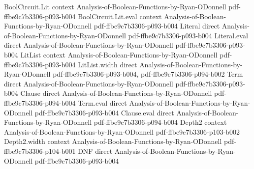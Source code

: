 \begin{theorem}
\leanok
{}
\proofstep
  {BoolCircuit.Lit}
  {context}
  {Analysis-of-Boolean-Functions-by-Ryan-ODonnell}
  {pdf-ffbe9c7b3306-p093-b004}
\proofstep
  {BoolCircuit.Lit.eval}
  {context}
  {Analysis-of-Boolean-Functions-by-Ryan-ODonnell}
  {pdf-ffbe9c7b3306-p093-b004}
\proofstep
  {Literal}
  {direct}
  {Analysis-of-Boolean-Functions-by-Ryan-ODonnell}
  {pdf-ffbe9c7b3306-p093-b004}
\proofstep
  {Literal.eval}
  {direct}
  {Analysis-of-Boolean-Functions-by-Ryan-ODonnell}
  {pdf-ffbe9c7b3306-p093-b004}
\proofstep
  {LitList}
  {context}
  {Analysis-of-Boolean-Functions-by-Ryan-ODonnell}
  {pdf-ffbe9c7b3306-p093-b004}
\proofstep
  {LitList.width}
  {direct}
  {Analysis-of-Boolean-Functions-by-Ryan-ODonnell}
  {pdf-ffbe9c7b3306-p093-b004,
    pdf-ffbe9c7b3306-p094-b002}
\proofstep
  {Term}
  {direct}
  {Analysis-of-Boolean-Functions-by-Ryan-ODonnell}
  {pdf-ffbe9c7b3306-p093-b004}
\proofstep
  {Clause}
  {direct}
  {Analysis-of-Boolean-Functions-by-Ryan-ODonnell}
  {pdf-ffbe9c7b3306-p094-b004}
\proofstep
  {Term.eval}
  {direct}
  {Analysis-of-Boolean-Functions-by-Ryan-ODonnell}
  {pdf-ffbe9c7b3306-p093-b004}
\proofstep
  {Clause.eval}
  {direct}
  {Analysis-of-Boolean-Functions-by-Ryan-ODonnell}
  {pdf-ffbe9c7b3306-p094-b004}
\proofstep
  {Depth2}
  {context}
  {Analysis-of-Boolean-Functions-by-Ryan-ODonnell}
  {pdf-ffbe9c7b3306-p103-b002}
\proofstep
  {Depth2.width}
  {context}
  {Analysis-of-Boolean-Functions-by-Ryan-ODonnell}
  {pdf-ffbe9c7b3306-p104-b001}
\proofstep
  {DNF}
  {direct}
  {Analysis-of-Boolean-Functions-by-Ryan-ODonnell}
  {pdf-ffbe9c7b3306-p093-b004}

\end{theorem}
